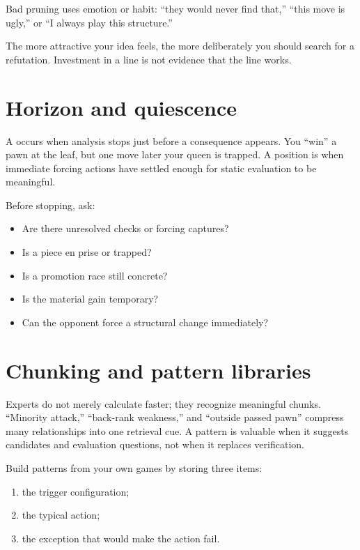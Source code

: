 Bad pruning uses emotion or habit: ``they would never find that,'' ``this move is ugly,'' or ``I always play this structure.''

\begin{warningbox}[title={Favorite-line bias}]
The more attractive your idea feels, the more deliberately you should search for a refutation. Investment in a line is not evidence that the line works.
\end{warningbox}

\section{Horizon and quiescence}
A  occurs when analysis stops just before a consequence appears. You ``win'' a pawn at the leaf, but one move later your queen is trapped. A position is  when immediate forcing actions have settled enough for static evaluation to be meaningful.

Before stopping, ask:

\begin{itemize}[leftmargin=1.4em]
\item Are there unresolved checks or forcing captures?
\item Is a piece en prise or trapped?
\item Is a promotion race still concrete?
\item Is the material gain temporary?
\item Can the opponent force a structural change immediately?
\end{itemize}

\section{Chunking and pattern libraries}
Experts do not merely calculate faster; they recognize meaningful chunks. ``Minority attack,'' ``back-rank weakness,'' and ``outside passed pawn'' compress many relationships into one retrieval cue. A pattern is valuable when it suggests candidates and evaluation questions, not when it replaces verification.

Build patterns from your own games by storing three items:

\begin{enumerate}[leftmargin=1.4em]
\item the trigger configuration;
\item the typical action;
\item the exception that would make the action fail.
\end{enumerate}

